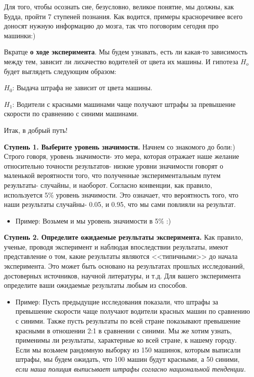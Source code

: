 \documentclass[final,pdftex]{../../template/epsilonj}
\numberwithin{equation}{section}
\begin{document}
Для того, чтобы осознать сие, безусловно, великое понятие, мы должны, как Будда, пройти 7 ступеней познания. Как водится, примеры красноречивее всего доносят нужную информацию до мозга, так что поговорим сегодня про машинки:)

Вкратце \textbf{о ходе эксперимента}. Мы будем узнавать, есть ли какая-то зависимость между тем, зависит ли лихачество водителей от цвета их машины. И гипотеза $H_o$ будет выглядеть следующим образом:

$H_0$: Выдача штрафа не зависит от цвета машины.

$H_1$: Водители с красными машинами чаще получают штрафы за превышение скорости по сравнению с синими машинами.


Итак, в добрый путь!

\textbf{Ступень 1. Выберите уровень значимости.} Начнем со знакомого до боли:) Строго говоря, уровень значимости- это мера, которая отражает наше желание относительно точности результатов- низкие уровни значимости говорят о маленькой вероятности того, что полученные экспериментальным путем результаты- случайны, и наоборот. Согласно конвенции, как правило, используется 5\% уровень значимости. Это означает, что вероятность того, что наши результаты случайны- 0.05, и 0.95, что мы сами повлияли на результат.

\begin{itemize}
	\item Пример: Возьмем и мы уровень значимости в 5\% :)
\end{itemize}

\textbf{Ступень 2. Определите ожидаемые результаты эксперимента.} Как правило, ученые, проводя эксперимент и наблюдая впоследствии результаты, имеют представление о том, какие результаты являются <<типичными>> до начала эксперимента. Это может быть основано на результатах прошлых исследований, достоверных источников, научной литературы, и т.д. Для вашего эксперимента определите ваши ожидаемые результаты любым из способов.

\begin{itemize}
	\item Пример: Пусть предыдущие исследования показали, что штрафы за превышение скорости чаще получают водители красных машин по сравнению с синими. Также пусть результаты по всей стране показывают превышение красными в отношении 2:1 в сравнении с синими. Мы же хотим узнать, применимы ли результаты, характерные ко всей стране, к нашему городу. Если мы возьмем рандомную выборку из 150 машинок, которым выписали штрафы, мы будем ожидать, что 100 машин будут красными, а 50 синими,\em{ если наша полиция выписывает штрафы согласно национальной тенденции}.
	
\end{itemize}
\end{document}
